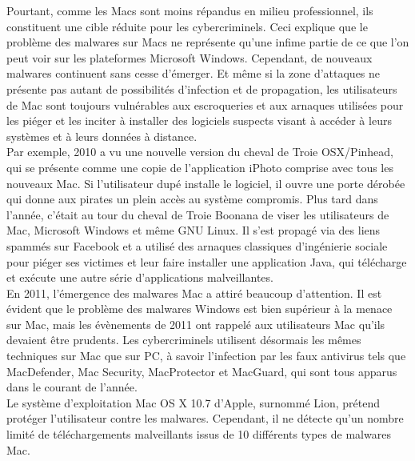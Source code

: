 Pourtant, comme les Macs sont moins répandus en milieu professionnel, ils constituent une cible réduite pour les 
cybercriminels. Ceci explique que le problème des malwares sur Macs ne représente qu'une infime partie de ce que l'on peut voir sur les plateformes Microsoft Windows. Cependant, de nouveaux malwares continuent sans cesse d'émerger. Et même si
la zone d'attaques ne présente pas autant de possibilités d'infection et de propagation, les utilisateurs de Mac sont toujours vulnérables aux escroqueries et aux arnaques utilisées pour les piéger et les inciter à installer des logiciels suspects visant à accéder à leurs systèmes et à leurs données à distance.\\


Par exemple, 2010 a vu une nouvelle version du cheval de Troie OSX/Pinhead, qui se présente comme une copie de l'application iPhoto comprise avec tous les nouveaux Mac. Si l'utilisateur dupé installe le logiciel, il ouvre une porte dérobée qui donne aux pirates un plein accès au système compromis. Plus tard dans l'année, c'était au tour du cheval de Troie Boonana de viser les utilisateurs de Mac, Microsoft Windows et même GNU Linux. Il s'est propagé via des liens spammés sur Facebook et a utilisé des arnaques  classiques d'ingénierie sociale pour piéger ses victimes et leur faire installer une application Java, qui télécharge et exécute une autre série d'applications malveillantes.\\


En 2011, l'émergence des malwares Mac a attiré beaucoup d'attention. Il est évident que le problème des malwares Windows est
bien supérieur à la menace sur Mac, mais les évènements de 2011 ont rappelé aux utilisateurs Mac qu'ils devaient être
prudents. Les cybercriminels utilisent désormais les mêmes techniques sur Mac que sur PC, à savoir l'infection par les faux antivirus tels que MacDefender, Mac Security, MacProtector et MacGuard, qui sont tous apparus dans le courant de l'année.\\

Le système d'exploitation Mac OS X 10.7 d'Apple, surnommé Lion, prétend protéger l'utilisateur contre les malwares. Cependant, il ne détecte qu'un nombre limité de téléchargements malveillants issus de 10 différents types de malwares
Mac.\\


